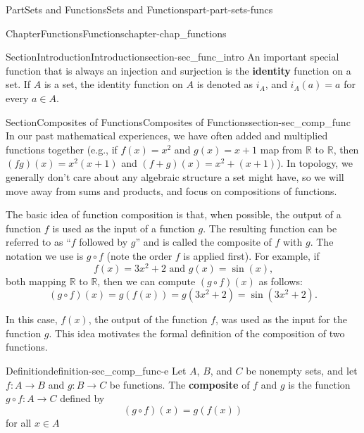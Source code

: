 \documentclass[oneside,10pt,]{book}
\newcommand{\terminology}[1]{\textbf{#1}}
\numberwithin{equation}{chapter}
\newcommand{\R}{\mathbb{R}}
\begin{document}
\begin{partptx}{Part}{Sets and Functions}{}{Sets and Functions}{}{}{part-part-sets-funcs}
\begin{chapterptx}{Chapter}{Functions}{}{Functions}{}{}{chapter-chap_functions}
\begin{sectionptx}{Section}{Introduction}{}{Introduction}{}{}{section-sec_func_intro}
An important special function that is always an injection and surjection is the \terminology{identity} function  on a set. If \(A\) is a set, the identity function on \(A\) is denoted as \(i_A\), and \(i_A(a) = a\) for every \(a \in A\).%
\end{sectionptx}
%
%
\typeout{************************************************}
\typeout{************************************************}
%
\begin{sectionptx}{Section}{Composites of Functions}{}{Composites of Functions}{}{}{section-sec_comp_func}
In our past mathematical experiences, we have often added and multiplied functions together (e.g., if \(f(x) = x^2\) and \(g(x) = x+1\) map from \(\R\) to \(\R\), then \((fg)(x) = x^2(x+1)\) and \((f+g)(x) = x^2+(x+1)\)). In topology, we generally don't care about any algebraic structure a set might have, so we will move away from sums and products, and focus on compositions of functions.%
\par
The basic idea of function composition is that, when possible, the output of a function \(f\) is used as the input of a function \(g\). The resulting function can be referred to as ``\(f\) followed by \(g\)'' and is called the composite of \(f\) with \(g\). The notation we use is \(g \circ f\) (note the order \textemdash{} \(f\) is applied first). For example, if%
\begin{equation*}
f(x) = 3x^2 + 2 \text{ and }  g(x) = \sin(x)\text{,}
\end{equation*}
both mapping \(\R\) to \(\R\), then we can compute \((g \circ f)(x)\) as follows:%
\begin{equation*}
(g \circ f)(x) = g(f(x)) = g(3x^2 + 2) = \sin\left(3x^2 + 2\right)\text{.}
\end{equation*}
%
\par
In this case, \(f(x)\), the output of the function \(f\), was used as the input for the function \(g\). This idea motivates the formal definition of the composition of two functions.%
\begin{definition}{Definition}{}{definition-sec_comp_func-e}%
%
Let \(A\), \(B\), and \(C\) be nonempty sets, and let \(f : A \to B\) and \(g : B \to C\) be functions. The \terminology{composite} of \(f\) and \(g\) is the function \(g \circ f : A \to C\) defined by%
\begin{equation*}
(g \circ f)(x) = g(f(x))
\end{equation*}
for all \(x \in A\)%

\end{definition}
\end{sectionptx}
\end{chapterptx}
\end{partptx}
\end{document}
